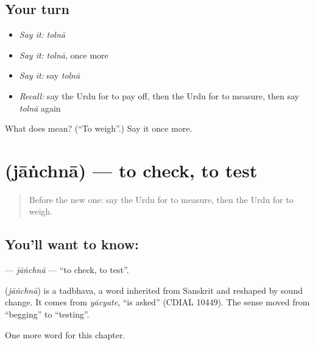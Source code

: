 \subsection*{Your turn}
\begin{itemize}
\raggedright
  \item \emph{Say it:} \emph{tolnā}
  \item \emph{Say it:} \emph{tolnā}, once more
  \item \emph{Say it:} say \emph{tolnā}
  \item \emph{Recall:} say the Urdu for to pay off, then the Urdu for to measure, then say \emph{tolnā} again
\end{itemize}

\begin{tcolorbox}[breakable,colback=teal!4,colframe=teal!35!black,title={Before you move on}]
What does  mean? (\textquotedblleft{}To weigh\textquotedblright{}.) Say it once more.
\end{tcolorbox}
\section[\texorpdfstring{\ur{جانچنا} (jāṅchnā)}{جانچنا (jāṅchnā)}]{ (jāṅchnā) — to check, to test}

\label{lesson:UR-C181-janchna}



\begin{quote}
Before the new one: say the Urdu for to measure, then the Urdu for to weigh.
\end{quote}

\subsection*{You'll want to know: }
\textbf{} — \emph{jāṅchnā} — \textquotedblleft{}to check, to test\textquotedblright{}.

\begin{cousinweb}
\textbf{} (\emph{jāṅchnā}) is a tadbhava, a word inherited from Sanskrit and reshaped by sound change. It comes from \emph{yācyate}, \textquotedblleft{}is asked\textquotedblright{} (CDIAL 10449). The sense moved from \textquotedblleft{}begging\textquotedblright{} to \textquotedblleft{}testing\textquotedblright{}.
\end{cousinweb}

\begin{grammarlens}[title={What you've built}]
One more word for this chapter.
\end{grammarlens}

